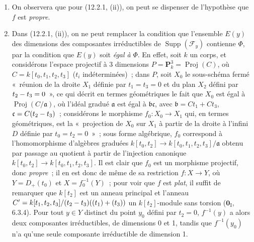 \begin{remarks}[12.2.3]
\label{IV.12.2.3-fr}
\begin{enumerate}[label=(\roman*)]
  \item On observera que pour (12.2.1, (ii)), on peut se dispenser de
  l'hypothèse que $f$ est \emph{propre}.

  \item Dans (12.2.1, (ii)), on ne peut remplacer la condition que l'ensemble
  $E(y)$ des dimensions des composantes irréductibles de
  $\operatorname{Supp}(\mathcal F_y)$ contienne $\Phi$, par la condition que
  $E(y)$ soit \emph{égal à} $\Phi$. En effet, soit $k$ un corps, et considérons
  l'espace projectif à 3 dimensions $P=\mathbf P^3_k=\operatorname{Proj}(C)$,
  où $C=k[t_0,t_1,t_2,t_3]$ ($t_i$ indéterminées)~; dans $P$, soit $X_0$ le
  sous-schéma fermé «~réunion de la droite $X_1$ définie par $t_1=t_3=0$ et
  du plan $X_2$ défini par $t_2- t_3=0$~», ce qui décrit en termes géométriques
  le fait que $X_0$ est égal à $\operatorname{Proj}(C/\mathfrak a)$, où l'idéal
  gradué $\mathfrak a$ est égal à $\mathfrak b\mathfrak c$, avec
  $\mathfrak b=Ct_1+Ct_3$, $\mathfrak c=C(t_2- t_3)$~; considérons le morphisme
  $f_0:X_0\to X_1$ qui, en termes géométriques, est la «~projection de $X_0$
  sur $X_1$ à partir de la droite à l'infini $D$ définie par $t_0=t_2=0$~»~;
  sous forme algébrique, $f_0$ correspond à l'homomorphisme d'algèbres graduées
  $k[t_0,t_2]\longrightarrow k[t_0,t_1,t_2,t_3]/\mathfrak a$
  obtenu par passage au quotient à partir de l'injection canonique
  $k[t_0,t_2]\to k[t_0,t_1,t_2,t_3]$. Il est clair que $f_0$ est un morphisme
  projectif, donc \emph{propre}~; il en est donc de même de sa restriction
  $f:X\to Y$, où $Y=D_+(t_0)$ et $X=f_0^{-1}(Y)$~; pour voir que $f$ est
  \emph{plat}, il suffit de remarquer que $k[t_2]$ est un anneau principal et
  l'anneau
  $C'=k[t_1,t_2,t_3]/(t_2- t_3)((t_1)+(t_3))$
  un $k[t_2]$-module sans torsion ($\mathbf 0_{\mathrm I}$, 6.3.4). Pour tout
  $y\in Y$ distinct du point $y_0$ défini par $t_2=0$, $f^{-1}(y)$ a alors
  deux composantes irréductibles, de dimensions 0 et 1, tandis que
  $f^{-1}(y_0)$ n'a qu'une seule composante irréductible de dimension 1.


\end{enumerate}
\end{remarks}
